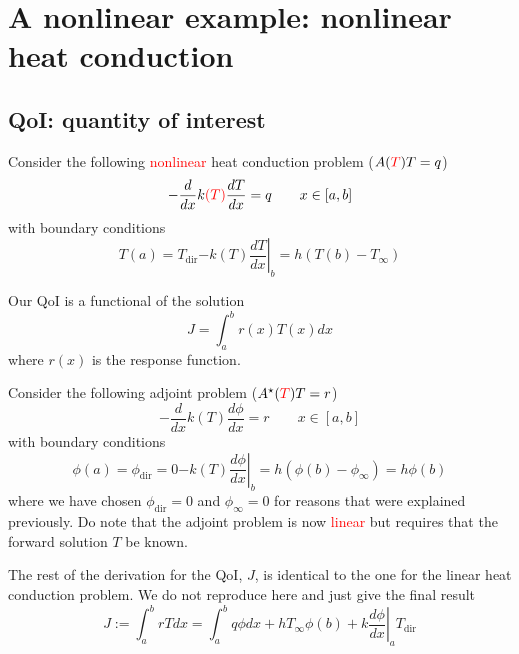 \documentclass[11pt]{article}
\newcommand{\be}{\begin{equation}}
\newcommand{\ee}{\end{equation}}
\newcommand{\tcr}[1]{\textcolor{red}{#1}}
\begin{document}
\section{A nonlinear example: nonlinear heat conduction}

\subsection{QoI: quantity of interest}

Consider the following \tcr{nonlinear} heat conduction problem ($A(\tcr{T})T=q$)
\be
\label{eq:ex_heat_conduction}
-\frac{d}{dx}k\tcr{(T)}\frac{dT}{dx}=q \qquad x\in [a,b]
\ee
with boundary conditions
\begin{subequations}
\label{eq:ex_heat_conduction_bc}
\be
T(a) = T_{\text{dir}} 
\ee
\be
-k(T) \left.\frac{dT}{dx}\right|_b = h(T(b)-T_{\infty})
\ee
\end{subequations}

Our QoI is a functional of the solution
\be
\label{eq:ex_heat_conduction_qoi}
J = \int_a^b r(x) T(x) dx
\ee
where $r(x)$ is the response function.

Consider the following adjoint problem ($A^\star(\tcr{T})T=r$)
\be
\label{eq:ex_heat_conduction_adjoint}
-\frac{d}{dx}k(T)\frac{d\phi}{dx}=r \qquad x\in [a,b]
\ee
with boundary conditions
\begin{subequations}
\label{eq:ex_heat_conduction_bc_adjoint}
\be
\phi(a) = \phi_{\text{dir}} = 0 
\ee
\be
-k(T) \left.\frac{d\phi}{dx}\right|_b = h(\phi(b)-\phi_{\infty}) = h\phi(b)
\ee
\end{subequations}
where we have chosen $\phi_{\text{dir}} = 0$ and $\phi_{\infty}=0$ for reasons that were explained previously. Do note that the adjoint problem is now \tcr{linear} but requires that the forward solution $T$ be known.

The rest of the derivation for the QoI, $J$, is identical to the one for the linear heat conduction problem. We do not reproduce here and just give the final result
\be
\boxed{
J := \int_a^b rT dx = \int_a^b q \phi dx + h T_{\infty} \phi(b) + \left.k\frac{d\phi}{dx}\right|_a T_{\text{dir}}
}
\ee
\end{document}
